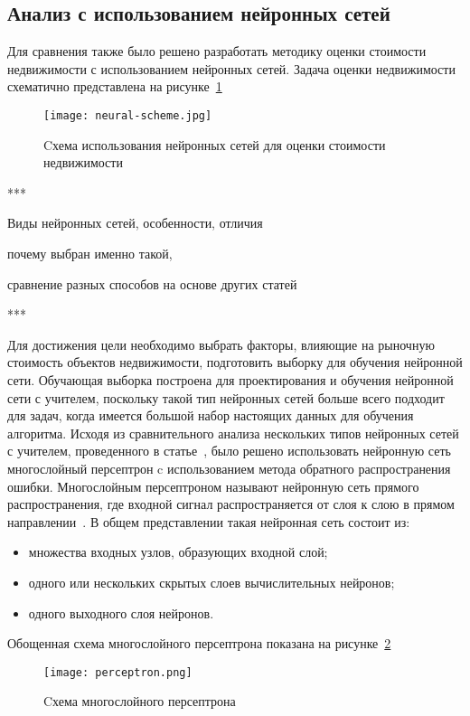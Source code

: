 \subsection{Анализ с использованием нейронных сетей}
\label{sec:experiment:neural_engines}

Для сравнения также было решено разработать методику оценки стоимости недвижимости с использованием
нейронных сетей. Задача оценки недвижимости схематично представлена на рисунке~\ref{fig:experiment:neural-scheme}

\begin{figure}[!ht]
  \centering
  \texttt{[image: neural-scheme.jpg]} 
  \caption{Cхема использования нейронных сетей для оценки стоимости недвижимости}
  \label{fig:experiment:neural-scheme}
\end{figure}

***

Виды нейронных сетей, особенности, отличия

почему выбран именно такой, 

сравнение разных способов на основе других статей

***

Для достижения цели необходимо выбрать факторы, влияющие на	рыночную стоимость объектов недвижимости, подготовить выборку для
обучения нейронной сети. Обучающая выборка построена для проектирования и обучения нейронной сети с учителем,
поскольку такой тип нейронных сетей больше всего подходит для задач, когда имеется большой набор настоящих данных для обучения
алгоритма. Исходя из сравнительного анализа нескольких типов нейронных сетей с учителем, проведенного в статье~\cite{using_neural_engines}, было
решено использовать нейронную сеть многослойный персептрон c использованием метода обратного распространения ошибки.
Многослойным персептроном называют нейронную сеть прямого распространения, где входной сигнал распространяется от слоя
к слою в прямом направлении~\cite{perceptron}. В общем представлении такая нейронная сеть состоит из:
\begin{itemize}
  \item множества входных узлов, образующих входной слой;
  \item одного или нескольких скрытых слоев вычислительных нейронов;
  \item одного выходного слоя нейронов.
\end{itemize}

Обощенная схема многослойного персептрона показана на рисунке~\ref{fig:experiment:perceptron-scheme}
\begin{figure}[!ht]
  \centering
  \texttt{[image: perceptron.png]}
  \caption{Cхема многослойного персептрона}
  \label{fig:experiment:perceptron-scheme}
\end{figure}

